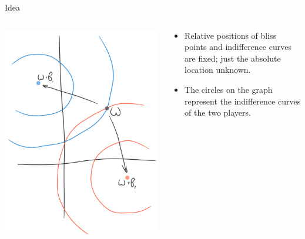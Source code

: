 \documentclass[english,10pt
,aspectratio=169
]{beamer}
\begin{document}
\begin{frame}{Idea}
\begin{columns}
	\begin{column}{0.5\textwidth}
		\begin{center}
			\includegraphics[scale=0.18]{pics/M4/battaglini01.png}
		\end{center}
	\end{column}
	\begin{column}{0.5\textwidth}
		{\small
			\begin{itemize}
				\item Relative positions of bliss points and indifference curves are fixed; just the absolute location unknown.
				\item The circles on the graph represent the indifference curves of the two players.
			\end{itemize}
		}
	\end{column}
\end{columns}
\end{frame}
\end{document}

